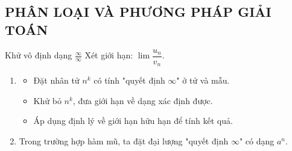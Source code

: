 \subsection{PHÂN LOẠI VÀ PHƯƠNG PHÁP GIẢI TOÁN}
\setcounter{dang}{0}
\begin{dang}{Khử vô định dạng $\frac{\infty}{\infty}$}
	Xét giới hạn: $\lim\dfrac{u_n}{v_n}$.
	\begin{enumerate}[\iconCV]
		\item {}
		\begin{itemize}
			\item Đặt nhân tử $n^k$ có tính "quyết định $\infty$" ở tử và mẫu.
			\item Khử bỏ $n^k$, đưa giới hạn về dạng xác định được.
			\item Áp dụng định lý về giới hạn hữu hạn để tính kết quả.
		\end{itemize}
		\item {} Trong trường hợp hàm mũ, ta đặt đại lượng "quyết định $\infty$" có dạng $a^n$.
	\end{enumerate}
\end{dang}

